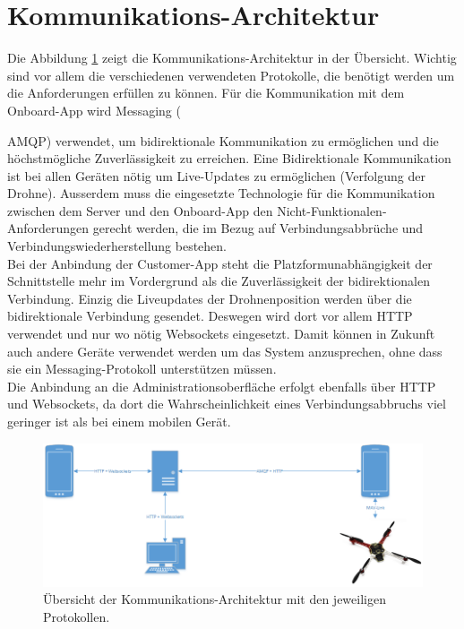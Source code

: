 \section{Kommunikations-Architektur}
\label{sec:communication-architecture}
Die Abbildung \ref{fig:communication-architecture-overview} zeigt die Kommunikations-Architektur in der Übersicht. Wichtig sind vor allem die verschiedenen verwendeten Protokolle, die benötigt werden um die Anforderungen erfüllen zu können. Für die Kommunikation mit dem Onboard-App wird Messaging ({\Gls{AMQP}) verwendet, um bidirektionale Kommunikation zu ermöglichen und die höchstmögliche Zuverlässigkeit zu erreichen. Eine Bidirektionale Kommunikation ist bei allen Geräten nötig um Live-Updates zu ermöglichen (Verfolgung der Drohne). Ausserdem muss die eingesetzte Technologie für die Kommunikation zwischen dem Server und den Onboard-App den Nicht-Funktionalen-Anforderungen gerecht werden, die im Bezug auf Verbindungsabbrüche und Verbindungswiederherstellung bestehen.\\
	
Bei der Anbindung der Customer-App steht die Platzformunabhängigkeit der Schnittstelle mehr im Vordergrund als die Zuverlässigkeit der bidirektionalen Verbindung. Einzig die Liveupdates der Drohnenposition werden über die bidirektionale Verbindung gesendet. Deswegen wird dort vor allem HTTP verwendet und nur wo nötig Websockets eingesetzt. Damit können in Zukunft auch andere Geräte verwendet werden um das System anzusprechen, ohne dass sie ein Messaging-Protokoll unterstützen müssen.\\

Die Anbindung an die Administrationsoberfläche erfolgt ebenfalls über HTTP und Websockets, da dort die Wahrscheinlichkeit eines Verbindungsabbruchs viel geringer ist als bei einem mobilen Gerät.\\

\begin{figure}[H]
	\includegraphics[width=1.0\textwidth]{images/Communication-Overview-Diagram.png}
	\caption{Übersicht der Kommunikations-Architektur mit den jeweiligen Protokollen. }
	\label{fig:communication-architecture-overview}
\end{figure}

}
